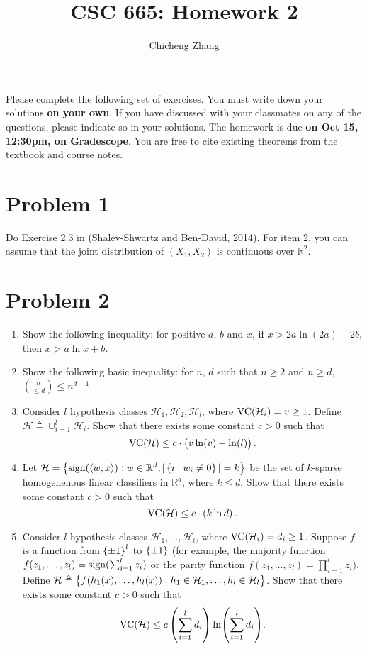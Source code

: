 \documentclass{article}
\title{CSC 665: Homework 2}
\author{Chicheng Zhang}
\DeclareMathOperator*{\sign}{{\rm sign}}
\DeclareMathOperator*{\VC}{{\rm VC}}
\newcommand{\RR}{\mathbb{R}} %
\newcommand{\Hcal}{\mathcal{H}} %
\newcommand{\defeq}{\triangleq}
\newcommand{\inner}[2]{\left\langle #1,#2 \right\rangle}
\begin{document}
\maketitle

Please complete the following set of exercises. You must write down your solutions \textbf{on your own}. If you have discussed with your classmates on any of the questions, please indicate so in your solutions.
The homework is due \textbf{on Oct 15, 12:30pm, on Gradescope}. You are free to
cite existing theorems from the textbook and course notes.

\section*{Problem 1}
Do Exercise 2.3 in (Shalev-Shwartz and Ben-David, 2014). For item 2, you can assume that the joint distribution of $(X_1, X_2)$ is continuous over $\RR^2$.


\section*{Problem 2}
\begin{enumerate}
  \item Show the following inequality: for positive $a$, $b$ and $x$,
  if $x > 2a \ln(2a) + 2b$, then $x > a \ln x + b$.
  \label{item:1-1}

  \item Show the following basic inequality: for $n$, $d$ such that $n \geq 2$ and
  $n \geq d$, ${n \choose {\leq d}} \leq n^{d+1}$.

  \item Consider $l$ hypothesis classes $\Hcal_1, \Hcal_2, \Hcal_l$, where
  $\VC(\Hcal_i) = v \geq 1$. Define $\Hcal \defeq \cup_{i=1}^l \Hcal_i$. Show
  that there exists some constant $c > 0$ such that
  \[ \VC(\Hcal) \leq c\cdot \del{v \ln(v) + \ln(l)}. \]
  \label{item:1-3}

  \item Let
  $\Hcal = \cbr{\sign(\inner{w}{x}): w \in \RR^d, |\cbr{i: w_i \neq 0}| = k}$ be
  the set of $k$-sparse homogenenous linear classifiers in $\RR^d$, where $k \leq d$.
  Show that there exists some constant $c > 0$ such that
  \[ \VC(\Hcal) \leq c \cdot \del{k \ln d}. \]

  \item Consider $l$ hypothesis classes $\Hcal_1, \ldots, \Hcal_l$, where
  $\VC(\Hcal_i) = d_i \geq 1$. Suppose $f$ is a function from $\cbr{\pm 1}^l$
  to $\cbr{\pm 1}$ (for example, the majority function
  $f(z_1,\ldots,z_l) = \sign(\sum_{i=1}^l z_i)$ or the parity function
  $f(z_1,\ldots,z_l) = \prod_{i=1}^l z_i)$.
  Define $\Hcal \defeq \cbr{ f(h_1(x), \ldots, h_l(x)): h_1 \in \Hcal_1, \ldots, h_l \in \Hcal_l}$. Show that
  there exists some constant $c > 0$ such that
  \[ \VC(\Hcal) \leq c \del{\sum_{i=1}^l d_i} \ln(\sum_{i=1}^l d_i). \]
\end{enumerate}
\end{document}
